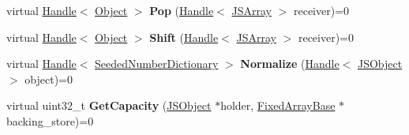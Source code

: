 \begin{DoxyCompactItemize}
\item 
virtual \hyperlink{classv8_1_1internal_1_1_handle}{Handle}$<$ \hyperlink{classv8_1_1internal_1_1_object}{Object} $>$ {\bfseries Pop} (\hyperlink{classv8_1_1internal_1_1_handle}{Handle}$<$ \hyperlink{classv8_1_1internal_1_1_j_s_array}{J\+S\+Array} $>$ receiver)=0\hypertarget{classv8_1_1internal_1_1_elements_accessor_a20cf75b5ea1982180d21e543c3804f43}{}\label{classv8_1_1internal_1_1_elements_accessor_a20cf75b5ea1982180d21e543c3804f43}

\item 
virtual \hyperlink{classv8_1_1internal_1_1_handle}{Handle}$<$ \hyperlink{classv8_1_1internal_1_1_object}{Object} $>$ {\bfseries Shift} (\hyperlink{classv8_1_1internal_1_1_handle}{Handle}$<$ \hyperlink{classv8_1_1internal_1_1_j_s_array}{J\+S\+Array} $>$ receiver)=0\hypertarget{classv8_1_1internal_1_1_elements_accessor_ae3e9680c466b8f006dfe54a9934e396c}{}\label{classv8_1_1internal_1_1_elements_accessor_ae3e9680c466b8f006dfe54a9934e396c}

\item 
virtual \hyperlink{classv8_1_1internal_1_1_handle}{Handle}$<$ \hyperlink{classv8_1_1internal_1_1_seeded_number_dictionary}{Seeded\+Number\+Dictionary} $>$ {\bfseries Normalize} (\hyperlink{classv8_1_1internal_1_1_handle}{Handle}$<$ \hyperlink{classv8_1_1internal_1_1_j_s_object}{J\+S\+Object} $>$ object)=0\hypertarget{classv8_1_1internal_1_1_elements_accessor_a83a8b16ca6e742e16e2929a9936460aa}{}\label{classv8_1_1internal_1_1_elements_accessor_a83a8b16ca6e742e16e2929a9936460aa}

\item 
virtual uint32\+\_\+t {\bfseries Get\+Capacity} (\hyperlink{classv8_1_1internal_1_1_j_s_object}{J\+S\+Object} $\ast$holder, \hyperlink{classv8_1_1internal_1_1_fixed_array_base}{Fixed\+Array\+Base} $\ast$backing\+\_\+store)=0\hypertarget{classv8_1_1internal_1_1_elements_accessor_a54c394f1822256e6dedf93ec57ea1eb0}{}\label{classv8_1_1internal_1_1_elements_accessor_a54c394f1822256e6dedf93ec57ea1eb0}

\end{DoxyCompactItemize}
